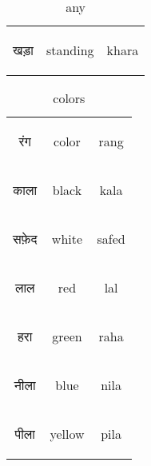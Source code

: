 \begin{table}[H]
    \centering
    \begin{tabular}{c|c|c}        
    \begin{hindi} खड़ा \end{hindi} & standing & khara \\
    \end{tabular}
    \caption{any}
    \label{tab:adjective_any}
\end{table}


\begin{table}[H]
    \centering
    \begin{tabular}{c|c|c}        
    \begin{hindi} रंग \end{hindi} & color & rang \\
    \begin{hindi} काला \end{hindi} & black & kala \\
    \begin{hindi} सफ़ेद \end{hindi} & white & safed \\
    \begin{hindi} लाल\end{hindi} & red & lal \\
    \begin{hindi} हरा\end{hindi} & green & raha \\
    \begin{hindi} नीला\end{hindi} & blue & nila \\
    \begin{hindi} पीला\end{hindi} & yellow & pila \\
    \end{tabular}
    \caption{colors}
    \label{tab:adjective_colors}
\end{table}


